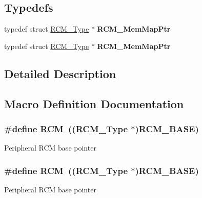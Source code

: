 \subsection*{Typedefs}
\begin{DoxyCompactItemize}
\item 
typedef struct \hyperlink{structRCM__Type}{R\+C\+M\+\_\+\+Type} $\ast$ {\bfseries R\+C\+M\+\_\+\+Mem\+Map\+Ptr}\hypertarget{group__RCM__Peripheral__Access__Layer_gac95728e1838541dba02817daa27f147a}{}\label{group__RCM__Peripheral__Access__Layer_gac95728e1838541dba02817daa27f147a}

\item 
typedef struct \hyperlink{structRCM__Type}{R\+C\+M\+\_\+\+Type} $\ast$ {\bfseries R\+C\+M\+\_\+\+Mem\+Map\+Ptr}\hypertarget{group__RCM__Peripheral__Access__Layer_gac95728e1838541dba02817daa27f147a}{}\label{group__RCM__Peripheral__Access__Layer_gac95728e1838541dba02817daa27f147a}

\end{DoxyCompactItemize}


\subsection{Detailed Description}


\subsection{Macro Definition Documentation}
\subsubsection[{\texorpdfstring{R\+CM}{RCM}}]{\setlength{\rightskip}{0pt plus 5cm}\#define R\+CM~(({\bf R\+C\+M\+\_\+\+Type} $\ast$){\bf R\+C\+M\+\_\+\+B\+A\+SE})}\hypertarget{group__RCM__Peripheral__Access__Layer_gaa5c5e6af3b266654facbd52caa0b8874}{}\label{group__RCM__Peripheral__Access__Layer_gaa5c5e6af3b266654facbd52caa0b8874}
Peripheral R\+CM base pointer 
\subsubsection[{\texorpdfstring{R\+CM}{RCM}}]{\setlength{\rightskip}{0pt plus 5cm}\#define R\+CM~(({\bf R\+C\+M\+\_\+\+Type} $\ast$){\bf R\+C\+M\+\_\+\+B\+A\+SE})}\hypertarget{group__RCM__Peripheral__Access__Layer_gaa5c5e6af3b266654facbd52caa0b8874}{}\label{group__RCM__Peripheral__Access__Layer_gaa5c5e6af3b266654facbd52caa0b8874}
Peripheral R\+CM base pointer 
